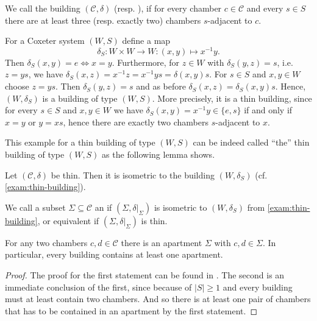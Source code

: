 \begin{defi}
	We call the building $(\mathcal{C}, \delta)$  (resp. ), if for every chamber $c \in \mathcal{C}$ and every $s \in S$ there are at least three (resp. exactly two) chambers $s$-adjacent to $c$.
\end{defi}

\begin{exam}
	For a Coxeter system $(W,S)$ define a map
	$$ \delta_S : W \times W \to W : (x,y) \mapsto x^{-1}y. $$
	Then $\delta_S(x,y) = e \iff x = y$. Furthermore, for $z \in W$ with $\delta_S(y,z) = s$, i.e.\ $z = ys$, we have $\delta_S(x,z) = x^{-1}z = x^{-1}ys = \delta(x,y)s$. For $s \in S$ and $x,y \in W$ choose $z = ys$. Then $\delta_S(y,z) = s$ and as before $\delta_S(x,z) = \delta_S(x,y)s$. Hence, $(W,\delta_S)$ is a building of type $(W,S)$. More precisely, it is a thin building, since for every $s \in S$ and $x,y \in W$ we have $\delta_S(x,y) = x^{-1}y \in \{e,s\}$ if and only if $x = y$ or $y = xs$, hence there are exactly two chambers $s$-adjacent to $x$.
\end{exam}

This example for a thin building of type $(W,S)$ can be indeed called ``the'' thin building of type $(W,S)$ as the following lemma shows.

\begin{theo}
	Let $(\mathcal{C}, \delta)$ be thin. Then it is isometric to the building $(W, \delta_S)$ (cf. \ref{exam:thin-building}).
\end{theo}

\begin{defi}
	We call a subset $\Sigma \subseteq \mathcal{C}$ an  if $(\Sigma, \delta|_\Sigma)$ is isometric to $(W,\delta_S)$ from \ref{exam:thin-building}, or equivalent if $(\Sigma, \delta|_\Sigma)$ is thin.
\end{defi}

\begin{theo}
	For any two chambers $c,d \in \mathcal{C}$ there is an apartment $\Sigma$ with $c,d \in \Sigma$. In particular, every building contains at least one apartment.

	\begin{proof}
		The proof for the first statement can be found in \cite[Theorem 11.2.5]{buekenhout:diagram-geometry}. The second is an immediate conclusion of the first, since because of $|S| \geq 1$ and  every building must at least contain two chambers. And so there is at least one pair of chambers that has to be contained in an apartment by the first statement.
	\end{proof}
\end{theo}

